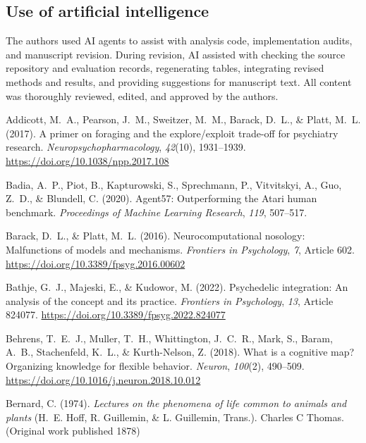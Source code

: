 \documentclass[12pt,fleqn]{article}
\begin{document}
\subsection*{Use of artificial intelligence}
The authors used AI agents to assist with analysis code, implementation audits, and manuscript revision. During revision, AI assisted with checking the source repository and evaluation records, regenerating tables, integrating revised methods and results, and providing suggestions for manuscript text. All content was thoroughly reviewed, edited, and approved by the authors.

\sloppy
\providecommand{\doiurl}[1]{\url{https://doi.org/#1}}
\begin{thebibliography}{}

  Addicott, M.~A., Pearson, J.~M., Sweitzer, M.~M., Barack, D.~L., \& Platt, M.~L. (2017).
  A primer on foraging and the explore/exploit trade-off for psychiatry research.
  \emph{Neuropsychopharmacology}, \emph{42}(10), 1931--1939.
  \doiurl{10.1038/npp.2017.108}

  Badia, A.~P., Piot, B., Kapturowski, S., Sprechmann, P., Vitvitskyi, A., Guo, Z.~D., \& Blundell, C. (2020).
  Agent57: Outperforming the Atari human benchmark.
  \emph{Proceedings of Machine Learning Research}, \emph{119}, 507--517.

  Barack, D.~L., \& Platt, M.~L. (2016).
  Neurocomputational nosology: Malfunctions of models and mechanisms.
  \emph{Frontiers in Psychology}, \emph{7}, Article 602.
  \doiurl{10.3389/fpsyg.2016.00602}

  Bathje, G.~J., Majeski, E., \& Kudowor, M. (2022).
  Psychedelic integration: An analysis of the concept and its practice.
  \emph{Frontiers in Psychology}, \emph{13}, Article 824077.
  \doiurl{10.3389/fpsyg.2022.824077}

  Behrens, T.~E.~J., Muller, T.~H., Whittington, J.~C.~R., Mark, S., Baram, A.~B., Stachenfeld, K.~L., \& Kurth-Nelson, Z. (2018).
  What is a cognitive map? Organizing knowledge for flexible behavior.
  \emph{Neuron}, \emph{100}(2), 490--509.
  \doiurl{10.1016/j.neuron.2018.10.012}

  Bernard, C. (1974).
  \emph{Lectures on the phenomena of life common to animals and plants}
  (H.~E. Hoff, R. Guillemin, \& L. Guillemin, Trans.). Charles C Thomas.
  (Original work published 1878)


\end{thebibliography}
\end{document}
